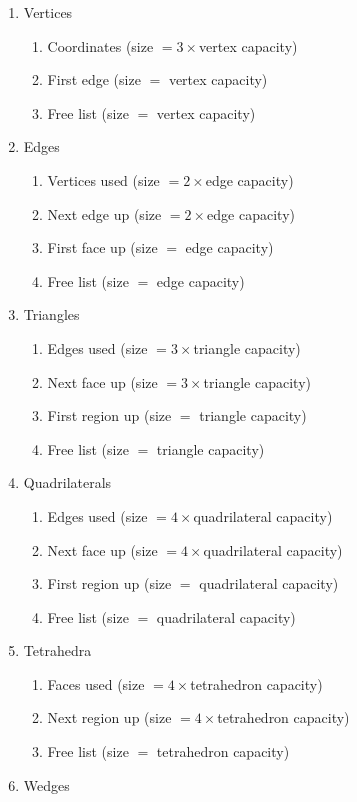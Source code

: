 \begin{enumerate}
\item Vertices
  \begin{enumerate}
  \item Coordinates (size $=3\times$vertex capacity)
  \item First edge (size $=$ vertex capacity)
  \item Free list (size $=$ vertex capacity)
  \end{enumerate}
\item Edges
  \begin{enumerate}
  \item Vertices used (size $=2\times$edge capacity)
  \item Next edge up (size $=2\times$edge capacity)
  \item First face up (size $=$ edge capacity)
  \item Free list (size $=$ edge capacity)
  \end{enumerate}
\item Triangles
  \begin{enumerate}
  \item Edges used (size $=3\times$triangle capacity)
  \item Next face up (size $=3\times$triangle capacity)
  \item First region up (size $=$ triangle capacity)
  \item Free list (size $=$ triangle capacity)
  \end{enumerate}
\item Quadrilaterals
  \begin{enumerate}
  \item Edges used (size $=4\times$quadrilateral capacity)
  \item Next face up (size $=4\times$quadrilateral capacity)
  \item First region up (size $=$ quadrilateral capacity)
  \item Free list (size $=$ quadrilateral capacity)
  \end{enumerate}
\item Tetrahedra
  \begin{enumerate}
  \item Faces used (size $=4\times$tetrahedron capacity)
  \item Next region up (size $=4\times$tetrahedron capacity)
  \item Free list (size $=$ tetrahedron capacity)
  \end{enumerate}
\item Wedges

\end{enumerate}
